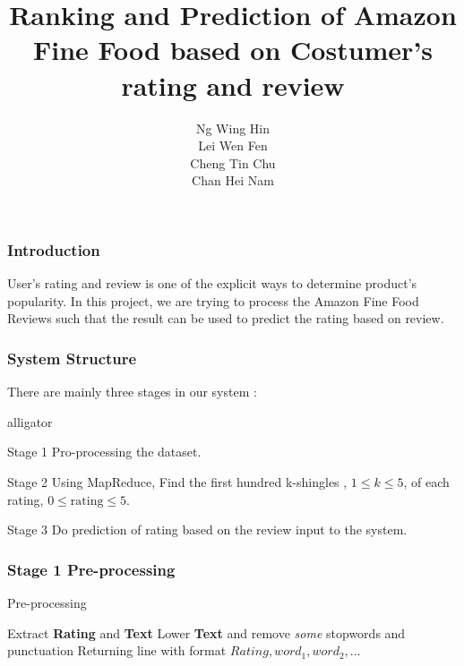 \documentclass[11pt]{beamer}
\author{Ng Wing Hin\\Lei Wen Fen\\Cheng Tin Chu\\Chan Hei Nam}
\title{Ranking and Prediction of Amazon Fine Food based on Costumer's rating and review}
\date{}
\begin{document}
\theoremstyle{plain}
\newtheorem{thm}{Theorem}[section] %

\theoremstyle{definition}
\newtheorem{defn}[thm]{Definition} %
\newtheorem{exmp}[thm]{Example} %
\newtheorem{prop}{Property}[section]


\begin{frame}
\titlepage
\end{frame}


\begin{frame}
\frametitle{Introduction}
User's rating and review is one of the explicit ways to determine product's popularity. In this project, we are trying to process the Amazon Fine Food Reviews such that the result can be used to predict the rating based on review.
\end{frame}

\begin{frame}
\frametitle{System Structure}
There are mainly three stages in our system : 
\begin{labeling}{alligator}
\item [Stage 1] Pro-processing the dataset.
\item [Stage 2] Using MapReduce, Find the first hundred k-shingles , \(1\leq k\leq 5\), of each rating, \(0\leq \mbox{rating} \leq 5\).
\item [Stage 3] Do prediction of rating based on the review input to the system. 
\end{labeling}
\end{frame}

\begin{frame}
\frametitle{Stage 1 Pre-processing}
\begin{algorithm}[H]
 \caption{Pre-processing}
 {
 	Extract \textbf{Rating} and \textbf{Text}\;
 	Lower \textbf{Text} and remove \emph{some} stopwords and punctuation\;
 	Returning line with format \(Rating, word_{1}, word_{2}, ...\)\;
 }
\end{algorithm}
\end{frame}
\end{document}
